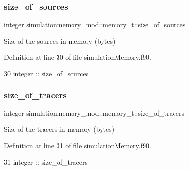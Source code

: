 \subsubsection{\texorpdfstring{size\+\_\+of\+\_\+sources}{size\_of\_sources}}
{\footnotesize\ttfamily integer simulationmemory\+\_\+mod\+::memory\+\_\+t\+::size\+\_\+of\+\_\+sources\hspace{0.3cm}{\ttfamily [private]}}



Size of the sources in memory (bytes) 



Definition at line 30 of file simulation\+Memory.\+f90.


\begin{DoxyCode}
30         \textcolor{keywordtype}{integer} :: size\_of\_sources
\end{DoxyCode}
\mbox{\label{structsimulationmemory__mod_1_1memory__t_ab0bafedbc072d99c7f8daf4f52cc1a29}} 
\subsubsection{\texorpdfstring{size\+\_\+of\+\_\+tracers}{size\_of\_tracers}}
{\footnotesize\ttfamily integer simulationmemory\+\_\+mod\+::memory\+\_\+t\+::size\+\_\+of\+\_\+tracers\hspace{0.3cm}{\ttfamily [private]}}



Size of the tracers in memory (bytes) 



Definition at line 31 of file simulation\+Memory.\+f90.


\begin{DoxyCode}
31         \textcolor{keywordtype}{integer} :: size\_of\_tracers
\end{DoxyCode}
\mbox{\label{structsimulationmemory__mod_1_1memory__t_aeb0ed70db36a56115ed196dc4a579d6d}} 
